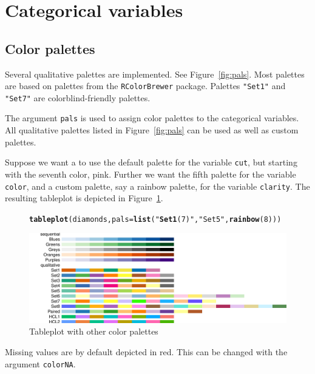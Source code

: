 \documentclass[11pt, fleqn, a4paper]{article}\usepackage{graphicx, color}
\makeatletter
\def\maxwidth{ %
  \ifdim\Gin@nat@width>\linewidth
    \linewidth
  \else
    \Gin@nat@width
  \fi
}
\newcommand{\hlfunctioncall}[1]{\textcolor[rgb]{0.501960784313725,0,0.329411764705882}{\textbf{#1}}}%
\newcommand{\hlstring}[1]{\textcolor[rgb]{0.6,0.6,1}{#1}}%
\newenvironment{kframe}{%
 \def\FrameCommand##1{\hskip\@totalleftmargin \hskip-\fboxsep
 \colorbox{shadecolor}{##1}\hskip-\fboxsep
     \hskip-\linewidth \hskip-\@totalleftmargin \hskip\columnwidth}%
 \MakeFramed {\advance\hsize-\width
   \@totalleftmargin\z@ \linewidth\hsize
   \@setminipage}}%
 {\par\unskip\endMakeFramed}
\newenvironment{knitrout}{}{} %
\makeatother
\begin{document}
\section{Categorical variables}
\subsection{Color palettes}
Several qualitative palettes are implemented. See Figure~\ref{fig:pals}. Most palettes are based on palettes from the {\tt RColorBrewer} package. Palettes {\tt "Set1"} and {\tt "Set7"} are colorblind-friendly palettes.

The argument {\tt pals} is used to assign color palettes to the categorical variables. All qualitative palettes listed in Figure~\ref{fig:pals} can be used as well as custom palettes.  

Suppose we want a to use the default palette for the variable {\tt cut}, but starting with the seventh color, pink. Further we want the fifth palette for the variable {\tt color}, and a custom palette, say a rainbow palette, for the variable {\tt clarity}. The resulting tableplot is depicted in Figure~\ref{fig:tp4}.


\begin{figure}[htp]
\begin{knitrout}
\color{fgcolor}\begin{kframe}
\begin{alltt}
\hlfunctioncall{tableplot}(diamonds, pals = \hlfunctioncall{list}(\hlstring{"\hlfunctioncall{Set1}(7)"}, \hlstring{"Set5"}, \hlfunctioncall{rainbow}(8)))
\end{alltt}
\end{kframe}\includegraphics[width=\maxwidth]{figure/chunk6} 
\end{knitrout}

\caption{Tableplot with other color palettes}
\label{fig:tp4}
\end{figure}


Missing values are by default depicted in red. This can be changed with the argument {\tt colorNA}.
\end{document}
